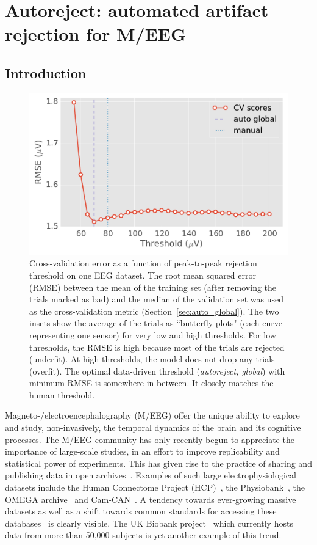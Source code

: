 \chapter{Autoreject: automated artifact rejection for M/EEG}

\section{Introduction}
\label{sec:introduction}

\begin{figure}[t]
	\centering
	\includegraphics[width=0.55\linewidth]{figures/figure1.pdf}
    \caption{Cross-validation error as a function of peak-to-peak rejection threshold on one EEG dataset. The root mean squared error (RMSE) between the mean of the training set (after removing the trials marked as bad) and the median of the validation set was used as the cross-validation metric (Section~\ref{sec:auto_global}). The two insets show the average of the trials as ``butterfly plots" (each curve representing one sensor) for very low and high thresholds. For low thresholds, the RMSE is high because most of the trials are rejected (underfit). At high thresholds, the model does not drop any trials (overfit). The optimal data-driven threshold (\emph{autoreject, global}) with minimum RMSE is somewhere in between. It closely matches the human threshold.}
    \label{fig:cross_val}
\end{figure}

Magneto-/electroencephalography (M/EEG) offer the unique ability to explore
and study, non-invasively, the temporal dynamics of the brain and its cognitive processes. The M/EEG community has only recently begun to appreciate the importance of large-scale studies, in an effort to improve replicability and statistical power of experiments. This has given rise to the practice of sharing and publishing data in open archives~\citep{gorgolewski2016practical}. Examples of such large electrophysiological datasets include the Human Connectome Project (HCP)~\citep{van2012human, larson2013adding}, the Physiobank~\citep{goldberger2000physiobank}, the OMEGA archive~\citep{niso2016omega} and Cam-CAN~\citep{taylor2015cambridge}. A tendency towards ever-growing massive datasets as well as a shift towards common standards for accessing these databases~\citep{gorgolewski2016brain,bigdely2013hierarchical} is clearly visible. The UK Biobank project~\citep{ollier2005uk} which currently hosts data from more than 50,000 subjects is yet another example of this trend.

